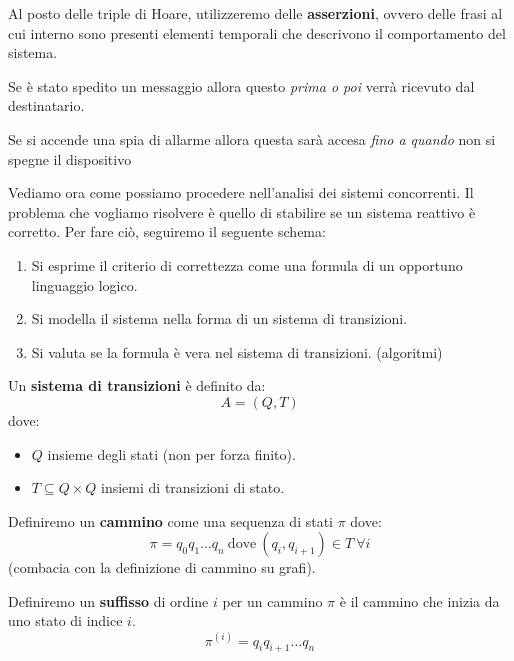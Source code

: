 Al posto delle triple di Hoare, utilizzeremo delle \textbf{asserzioni}, ovvero
delle frasi al cui interno sono presenti elementi temporali che descrivono il
comportamento del sistema.
\begin{esempio}
    Se è stato spedito un messaggio allora questo \textit{prima o poi} verrà
    ricevuto dal destinatario.
\end{esempio}
\begin{esempio}
    Se si accende una spia di allarme allora questa sarà accesa \textit{fino a
        quando} non si spegne il dispositivo
\end{esempio}
Vediamo ora come possiamo procedere nell'analisi dei sistemi concorrenti. Il
problema che vogliamo risolvere è quello di stabilire se un sistema reattivo è
corretto. Per fare ciò, seguiremo il seguente schema:
\begin{enumerate}
    \item Si esprime il criterio di correttezza come una formula di un opportuno
          linguaggio logico.
    \item Si modella il sistema nella forma di un sistema di transizioni.
    \item Si valuta se la formula è vera nel sistema di transizioni. (algoritmi)
\end{enumerate}
\begin{definizione}
    Un \textbf{sistema di transizioni} è definito da:
    \begin{equation}
        A=(Q,T)
    \end{equation}
    dove:
    \begin{itemize}
        \item $Q$ insieme degli stati (non per forza finito).
        \item $T \subseteq Q \times Q$ insiemi di transizioni di stato.
    \end{itemize}
\end{definizione}
\begin{definizione}
    Definiremo un \textbf{cammino} come una sequenza di stati $\pi$ dove:
    \begin{equation}
        \pi = q_0q_1\dots q_n \ \text{dove} \ (q_i,q_{i+1})\in T \ \forall i
    \end{equation}
    (combacia con la definizione di cammino su grafi).
\end{definizione}
\begin{definizione}
    Definiremo un \textbf{suffisso} di ordine $i$ per un cammino $\pi$ è il
    cammino che inizia da uno stato di indice $i$.
    \begin{equation}
        \pi^{(i)} = q_iq_{i+1}\dots q_n
    \end{equation}
\end{definizione}
